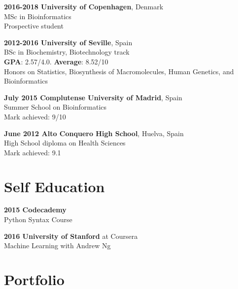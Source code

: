 \documentclass[letterpaper]{article}
\renewenvironment{itemize}{
  \begin{list}{}{
    \setlength{\leftmargin}{1em}
  }
}{
  \end{list}
}
\begin{document}
\begin{itemize}

  \item \textbf{2016-2018 University of Copenhagen}, Denmark \\ MSc in Bioinformatics \\ Prospective student
  

  \item \textbf{2012-2016 University of Seville}, Spain \\ BSc in Biochemistry, Biotechnology track \\
    \textbf{GPA}: 2.57/4.0. \textbf{Average}: 8.52/10 \\
  Honors on Statistics, Biosynthesis of Macromolecules, Human Genetics, and Bioinformatics
  
  \item \textbf{July 2015 Complutense University of Madrid}, Spain \\ Summer School on Bioinformatics \\ Mark achieved: 9/10
  
  \item \textbf{June 2012 Alto Conquero High School}, Huelva, Spain \\
  High School diploma on Health Sciences \\
  Mark achieved: 9.1 \\

\end{itemize}


\section*{Self Education}

\begin{itemize}

  \item \textbf{2015 Codecademy} \\ 
  Python Syntax Course
  
  \item \textbf{2016 University of Stanford} at Coursera \\
  Machine Learning with Andrew Ng
  
    
    
\end{itemize}

\section*{Portfolio}
\end{document}
